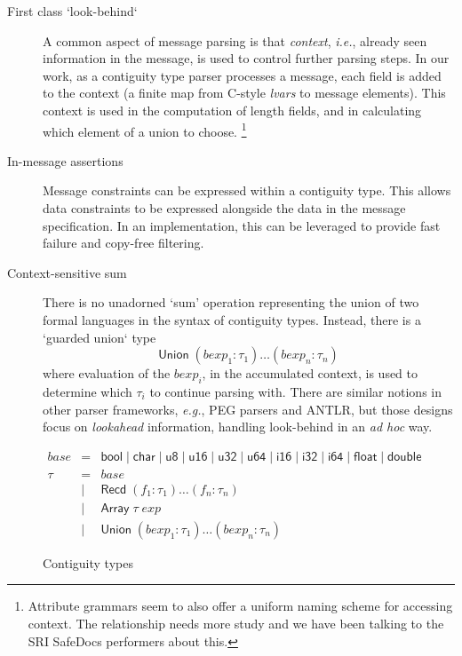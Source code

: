 \documentclass{article}
\newcommand{\ie}{\textit{i.e.}}
\newcommand{\eg}{\textit{e.g.}}
\newcommand{\adhoc}{\textit{ad hoc}}
\newcommand{\konst}[1]{\ensuremath{\mathsf{#1}}}
\theoremstyle{definition}
\begin{document}
\begin{description}

\item [First class `look-behind`] A common aspect of message parsing
  is that \emph{context}, \ie, already seen information in the
  message, is used to control further parsing steps. In our work, as a
  contiguity type parser processes a message, each field is added to
  the context (a finite map from C-style \emph{lvars} to message
  elements). This context is used in the computation of length fields,
  and in calculating which element of a union to
  choose. \footnote{Attribute grammars seem to also offer a uniform
    naming scheme for accessing context. The relationship needs more
    study and we have been talking to the SRI SafeDocs performers
    about this.}

\item [In-message assertions] Message constraints can be expressed
  within a contiguity type. This allows data constraints to be
  expressed alongside the data in the message specification. In an
  implementation, this can be leveraged to provide fast failure and
  copy-free filtering.

\item [Context-sensitive sum] There is no unadorned `sum' operation
  representing the union of two formal languages in the syntax of
  contiguity types. Instead, there is a `guarded union` type
  \[
    \konst{Union}\; (\mathit{bexp}_1 : \tau_1) \ldots (\mathit{bexp}_n : \tau_n)
  \]
  where evaluation of the $\mathit{bexp}_i$, in the accumulated
  context, is used to determine which $\tau_i$ to continue parsing
  with. There are similar notions in other parser frameworks, \eg, PEG
  parsers and ANTLR, but those designs focus on \emph{lookahead}
  information, handling look-behind in an \adhoc{} way.

\end{description}


\begin{figure}
\[
\begin{array}{rcl}
 \mathit{base} & = & \konst{bool} \mid \konst{char} \mid \konst{u8} \mid
 \konst{u16} \mid \konst{u32} \mid \konst{u64}  \mid \konst{i16} \mid
 \konst{i32} \mid \konst{i64} \mid \konst{float} \mid \konst{double} \\
 \tau & = & \mathit{base} \\
      & \mid & \konst{Recd}\; (f_1 : \tau_1) \ldots (f_n : \tau_n) \\
      & \mid & \konst{Array}\; \tau \; \mathit{exp} \\
      & \mid & \konst{Union}\; (\mathit{bexp}_1 : \tau_1) \ldots (\mathit{bexp}_n : \tau_n)
\end{array}
\]
\caption{Contiguity types}
\label{ctypes}
\end{figure}
\end{document}
